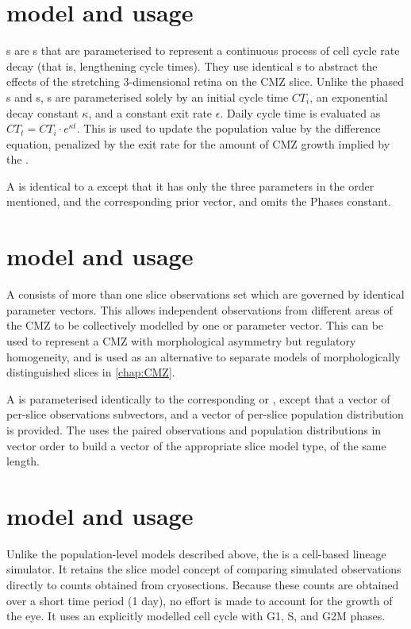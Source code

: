 \section{\protect{} model and usage}
\label{sec:decaymodel}
s are s that are parameterised to represent a continuous process of cell cycle rate decay (that is, lengthening cycle times). They use identical s to abstract the effects of the stretching 3-dimensional retina on the CMZ slice. Unlike the phased s and s, s are parameterised solely by an initial cycle time $CT_{i}$, an exponential decay constant $\kappa$, and a constant exit rate $\epsilon$. Daily cycle time is evaluated as $CT_{t}=CT_i \cdot e^{\kappa t}$. This is used to update the population value by the  difference equation, penalized by the exit rate for the amount of CMZ growth implied by the .

A  is identical to a  except that it has only the three parameters in the order mentioned, and the corresponding prior vector, and omits the Phases constant.

\section{\protect{} model and usage}
A  consists of more than one slice observations set which are governed by identical parameter vectors. This allows independent observations from different areas of the CMZ to be collectively modelled by one  or  parameter vector. This can be used to represent a CMZ with morphological asymmetry but regulatory homogeneity, and is used as an alternative to separate models of morphologically distinguished slices in \autoref{chap:CMZ}. 

A  is parameterised identically to the corresponding  or , except that a vector of per-slice observations subvectors, and a vector of per-slice population distribution is provided. The  uses the paired observations and population distributions in vector order to build a vector of the appropriate slice model type, of the same length.

\section{\protect{} model and usage}
\label{sec:thymidinemodel}
Unlike the population-level models described above, the  is a cell-based lineage simulator. It retains the slice model concept of comparing simulated observations directly to counts obtained from cryosections. Because these counts are obtained over a short time period (1 day), no effort is made to account for the growth of the eye. It uses an explicitly modelled cell cycle with G1, S, and G2\/M phases.

